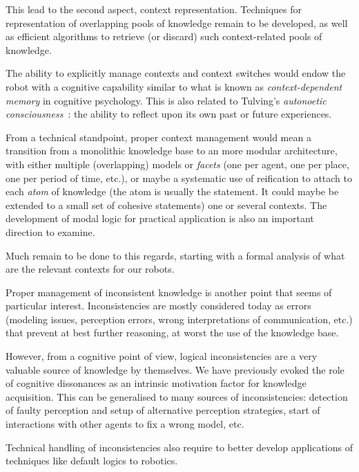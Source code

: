 This lead to the second aspect, context representation. Techniques for
representation of overlapping pools of knowledge remain to be developed, as
well as efficient algorithms to retrieve (or discard) such context-related
pools of knowledge.

The ability to explicitly manage contexts and context switches would endow the
robot with a cognitive capability similar to what is known as
\emph{context-dependent memory} in cognitive psychology. This is also related to
Tulving's \emph{autonoetic consciousness}~\cite{Tulving1985a}: the ability to
reflect upon its own past or future experiences.

From a technical standpoint, proper context management would mean a transition
from a monolithic knowledge base to an more modular architecture, with either
multiple (overlapping) models or \emph{facets} (one per agent, one per place,
one per period of time, etc.), or maybe a systematic use of reification to
attach to each \emph{atom} of knowledge (the atom is usually the statement. It
could maybe be extended to a small set of cohesive statements) one or several
contexts. The development of modal logic for practical application is also an
important direction to examine.

Much remain to be done to this regards, starting with a formal analysis of what
are the relevant contexts for our robots.

\par

Proper management of inconsistent knowledge is another point that seems of
particular interest. Inconsistencies are mostly considered today as errors
(modeling issues, perception errors, wrong interpretations of communication, etc.)
that prevent at best further reasoning, at worst the use of the knowledge base.

However, from a cognitive point of view, logical inconsistencies are a very
valuable source of knowledge by themselves. We have previously evoked the role
of cognitive dissonances as an intrinsic motivation factor for knowledge
acquisition. This can be generalised to many sources of inconsistencies:
detection of faulty perception and setup of alternative perception strategies,
start of interactions with other agents to fix a wrong model, etc.

Technical handling of inconsistencies also require to better develop
applications of techniques like default logics to robotics.

\par

